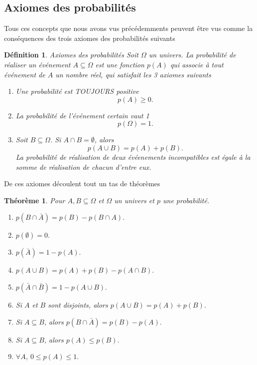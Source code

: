 \documentclass[a4paper,12pt]{book}
\newtheorem{definition}{Définition}
\newtheorem{theoreme}{Théorème}
\begin{document}
\subsection{Axiomes des probabilités}
Tous ces concepts que nous avons vus précédemments peuvent être vus comme la conséquences des trois axiomes des probabilités
suivants
\begin{definition}{Axiomes  des probabilités}
Soit $\Omega$ un univers. La probabilité de réaliser un événement $A\subseteq\Omega$ est une fonction $p(A)$ qui associe à tout 
événement de $A$ un nombre réel, qui satisfait les 3 axiomes suivants
\begin{enumerate}
 \item Une probabilité est TOUJOURS positive
 \begin{equation}
  p(A)\geq 0.
 \end{equation}

 \item La probabilité de l'événement certain vaut 1
 \begin{equation}
  p(\Omega)=1.
 \end{equation}
 \item Soit $B\subseteq\Omega$. Si $A\cap B=\emptyset$, alors 
 \begin{equation}
 p(A\cup B)=p(A)+p(B). 
 \end{equation}
 La probabilité de réalisation de deux évéenements incompatibles est égale à la somme de réalisation
 de chacun d'entre eux.
\end{enumerate}
\end{definition}

De ces axiomes découlent tout un tas de théorèmes
\begin{theoreme}
Pour $A,B\subseteq\Omega$ et $\Omega$ un univers et $p$ une probabilité.
\begin{enumerate}
 \item $p(B\cap\bar A)=p(B)-p(B\cap A).$
 \item $p(\emptyset)=0.$
 \item $p(\bar A)=1-p(A).$
 \item $p(A\cup B)=p(A)+p(B)-p(A\cap B).$
 \item $p(\bar A\cap \bar B)=1-p(A\cup B).$
 \item Si $A$ et $B$ sont disjoints, alors $p(A\cup B)=p(A)+p(B).$ 
 \item Si $A\subseteq B$, alors $p(B\cap \bar A)=p(B)-p(A).$ 
 \item Si $A\subseteq B$, alors $p(A)\leq p(B).$ 
 \item $\forall A$, $0\leq p(A)\leq 1.$ 
\end{enumerate}

 
\end{theoreme}
\end{document}
